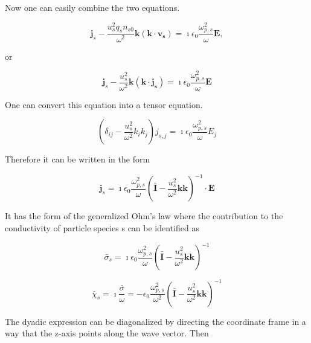 \documentclass[a4paper,11pt]{thesis}
\begin{document}
Now one can easily combine the two equations.

\begin{equation}
      \mathbf{j}_s  -  \frac{u_s^2 q_s n_{s0}}{  \omega^2} \mathbf{k}(\mathbf{k} \cdot  \mathbf{v_s})
     = \imath \epsilon_0 \frac{\omega_{p,s}^2}{  \omega} \mathbf{E},
\end{equation}

or

\begin{equation}
      \mathbf{j}_s  -  \frac{u_s^2 }{  \omega^2} \mathbf{k}(\mathbf{k} \cdot  \mathbf{j_s})
     = \imath \epsilon_0 \frac{\omega_{p,s}^2}{  \omega} \mathbf{E}
\end{equation}

One can convert this equation into a tensor equation.

\begin{equation}
      \left(\delta_{ij} -  \frac{u_s^2 }{  \omega^2} k_i k_j \right) j_{s,j}
     = \imath \epsilon_0 \frac{\omega_{p,s}^2}{  \omega} E_j
\end{equation}


Therefore it can be written in the form

\begin{equation}
   \mathbf{j}_s = \imath \epsilon_0 \frac{\omega_{p,s}^2}{  \omega} \left( \bar{\mathbf{I}}  -  \frac{u_s^2 }{  \omega^2} \mathbf{k}\mathbf{k} \right)^{-1} \cdot \mathbf{E}
\end{equation}

It has the form of the generalized Ohm's law where the contribution to the conductivity of particle species s can be identified as

\begin{equation}
   \bar{\sigma}_s = \imath \epsilon_0 \frac{\omega_{p,s}^2}{  \omega} \left( \bar{\mathbf{I}}  -  \frac{u_s^2 }{  \omega^2} \mathbf{k}\mathbf{k} \right)^{-1}
\end{equation}


\begin{equation}
   \bar{\chi}_s =\imath \frac{\bar{\sigma}}{\omega} = - \epsilon_0 \frac{\omega_{p,s}^2}{  \omega^2} \left( \bar{\mathbf{I}}  -  \frac{u_s^2 }{  \omega^2} \mathbf{k}\mathbf{k} \right)^{-1}
\end{equation}

The dyadic expression can be diagonalized by directing the coordinate frame in a way that the z-axis points along the wave vector. Then
\end{document}

